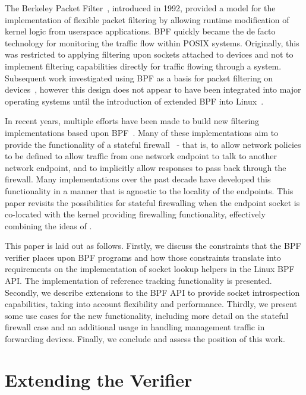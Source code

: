 \documentclass[10pt,sigconf,authorversion]{lpc}
\begin{document}
The Berkeley Packet Filter~\cite{cbpf}, introduced in 1992, provided a model
for the implementation of flexible packet filtering by allowing runtime
modification of kernel logic from userspace applications. BPF quickly became
the de facto technology for monitoring the traffic flow within POSIX systems.
Originally, this was restricted to applying filtering upon sockets attached to
devices and not to implement filtering capabilities directly for traffic
flowing through a system. Subsequent work investigated using BPF as a basis for
packet filtering on devices~\cite{ipfw}, however this design does not appear to
have been integrated into major operating systems until the introduction of
extended BPF into Linux~\cite{lwnebpf}.

In recent years, multiple efforts have been made to build new filtering
implementations based upon
BPF~\cite{cilium,ovs-ebpf,nsx-harmony,droplet,xdp-ddos,alfwrapper}. Many of
these implementations aim to provide the functionality of a stateful
firewall~\cite{stateful-fw} - that is, to allow network policies to be defined
to allow traffic from one network endpoint to talk to another network endpoint,
and to implicitly allow responses to pass back through the firewall. Many
implementations over the past decade have developed this functionality in a
manner that is agnostic to the locality of the endpoints. This paper revisits
the possibilities for stateful firewalling when the endpoint socket is
co-located with the kernel providing firewalling functionality, effectively
combining the ideas of \cite{ipfw,stateful-fw,dfw}.

This paper is laid out as follows. Firstly, we discuss the constraints that the
BPF verifier places upon BPF programs and how those constraints translate into
requirements on the implementation of socket lookup helpers in the Linux BPF
API. The implementation of reference tracking functionality is presented.
Secondly, we describe extensions to the BPF API to provide socket introspection
capabilities, taking into account flexibility and performance. Thirdly, we
present some use cases for the new functionality, including more detail on the
stateful firewall case and an additional usage in handling management traffic
in forwarding devices. Finally, we conclude and assess the position of this
work.

\section{Extending the Verifier}
\end{document}
